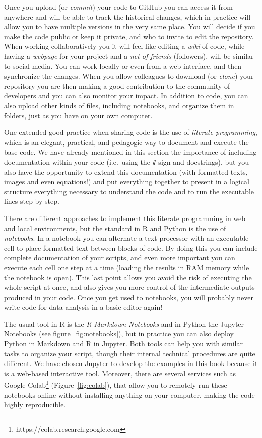 Once you upload (or \textit{commit}) your code to GitHub you can  access  it from anywhere and will be able to track the historical changes, which in practice will allow you to have multiple versions in the very same place. You will decide if you make the code public or keep it private, and who to invite to edit the repository. When working collaboratively you it will feel like editing a \textit{wiki} of code, while having a \textit{webpage} for your project and a \textit{net of friends} (followers), will be similar to social media. You can work locally or even from a web interface, and then synchronize the changes. When you allow colleagues to download (or \textit{clone}) your repository you are then making a good contribution to the community of developers and you can also monitor your impact. In addition to code, you can also upload other kinds of files, including notebooks, and organize them in folders, just as you have  on your own computer.

One extended good practice when sharing code is the use of \textit{literate programming}, which is an elegant, practical, and pedagogic way to document and execute the base code. We have already mentioned in this section the importance of including documentation within your code (i.e.\ using the \texttt{\#} sign and docstrings), but you also have the opportunity to extend this documentation (with formatted texts, images and even equations!) and put everything together to present in a logical structure everything necessary to understand the code and to run the executable lines step by step.

There are different approaches to implement this literate programming in web and local environments, but the standard in R and Python is the use of \textit{notebooks}. In a notebook you can alternate a text processor with an executable cell to place formatted text between blocks of code. By doing this you can include complete documentation of your scripts, and even more important you can execute each cell one step at a time (loading the results in RAM memory while the notebook is open). This last point allows you avoid the risk of executing the whole script at once, and also gives you more control of the intermediate outputs produced in your code. Once you get used to notebooks, you will probably never write code for data analysis in a basic editor again!

The usual tool in R is the \textit{R Markdown Notebooks} and in Python the Jupyter Notebooks (see figure~\ref{fig:notebooks}), but in practice you can also deploy Python in Markdown and R in Jupyter. Both tools can help you with similar tasks to organize your script, though their internal technical procedures are quite different. We have chosen Jupyter to develop the examples in this book because it is a web-based interactive tool. Moreover, there are several services such as Google Colab\footnote{https://colab.research.google.com} (Figure~\ref{fig:colab}), that allow you to remotely run these notebooks online without installing anything on your computer, making the code highly reproducible.

